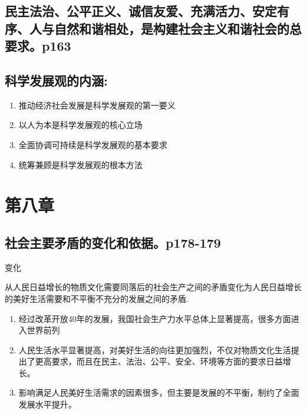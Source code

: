 \documentclass[UTF8]{ctexart}
\begin{document}
\subsection{民主法治、公平正义、诚信友爱、充满活力、安定有序、人与自然和谐相处，是构建社会主义和谐社会的总要求。p163}
\subsection{科学发展观的内涵:}
\begin{enumerate}[(1)]
    \item 推动经济社会发展是科学发展观的第一要义
    \item 以人为本是科学发展观的核心立场
    \item 全面协调可持续是科学发展观的基本要求
    \item 统筹兼顾是科学发展观的根本方法
\end{enumerate}
\section{第八章}
\subsection{社会主要矛盾的变化和依据。p178-179}
\par 变化
\par \qquad 从人民日益增长的物质文化需要同落后的社会生产之间的矛盾变化为人民日益增长的美好生活需要和不平衡不充分的发展之间的矛盾.
\begin{enumerate}[(1)]
    \item 经过改革开放40年的发展，我国社会生产力水平总体上显著提高，很多方面进入世界前列
    \item 人民生活水平显著提高，对美好生活的向往更加强烈，不仅对物质文化生活提出了更高要求，而且在民主、法治、公平、安全、环境等方面的要求日益增长。
    \item 影响满足人民美好生活需求的因素很多，但主要是发展的不平衡，制约了全面发展水平提升。
\end{enumerate}
\end{document}
